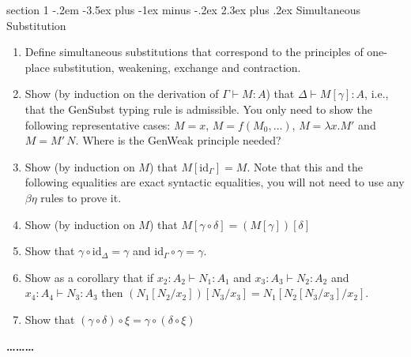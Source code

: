 \documentclass[12pt]{article}
\makeatletter
\newenvironment{problem}{\@startsection
       {section}
       {1}
       {-.2em}
       {-3.5ex plus -1ex minus -.2ex}
       {2.3ex plus .2ex}
       {\pagebreak[3]%
       \large\bf\noindent{Problem }
       }
       }
       {%
       \begin{center}\large\bf \ldots\ldots\ldots\end{center}}
\newcommand{\id}{\textrm{id}}
\makeatother
\begin{document}
\begin{problem}{Simultaneous Substitution}
  \begin{enumerate}
  \item Define simultaneous substitutions that correspond to the principles of
    one-place substitution, weakening, exchange and contraction.
  \item Show (by induction on the derivation of $\Gamma \vdash M : A$)
    that $\Delta \vdash M[\gamma] : A$, i.e., that the GenSubst typing
    rule is admissible. You only need to show the following
    representative cases: $M = x$, $M = f(M_0,\ldots)$, $M = \lambda
    x. M'$ and $M = M'\,N$. Where is the GenWeak principle needed?

  \item Show (by induction on $M$) that $M[\id_\Gamma] = M$. Note that this and the
    following equalities are exact syntactic equalities, you will not
    need to use any $\beta\eta$ rules to prove it.
  \item Show (by induction on $M$) that $M[\gamma \circ \delta] = (M[\gamma])[\delta]$
  \item Show that $\gamma \circ \id_{\Delta} = \gamma$ and
    $\id_{\Gamma} \circ \gamma = \gamma$.
  \item Show as a corollary that if $x_2 : A_2 \vdash N_1 : A_1$ and
    $x_3 : A_3 \vdash N_2 : A_2$ and $x_4 : A_4 \vdash N_3 : A_3$ then
    $(N_1[N_2/x_2])[N_3/x_3] = N_1[N_2[N_3/x_3]/x_2]$.
  \item Show that $(\gamma \circ \delta) \circ \xi = \gamma \circ (\delta \circ \xi)$
  \end{enumerate}
\end{problem}
\end{document}
